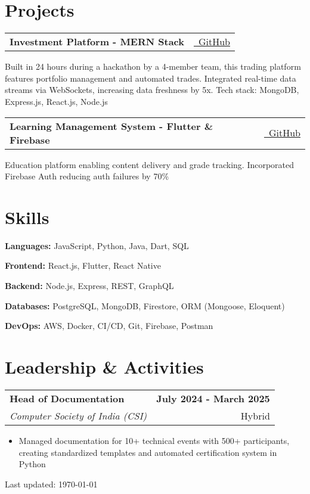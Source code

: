 \documentclass[10pt,a4paper]{article}
\makeatletter
\newcommand{\resumeItem}[1]{\item\small{#1}}
\newcommand{\resumeSubheading}[4]{
  \vspace{0pt}
  \begin{tabular*}{\textwidth}[t]{l@{\extracolsep{\fill}}r}
    \textbf{#1} & \small\textbf{#2} \\
    \textit{\small#3} & \small#4 \\
  \end{tabular*}\vspace{0pt}
}
\newcommand{\resumeProject}[3]{
  \vspace{-2pt}
  \begin{tabular*}{\textwidth}[t]{l@{\extracolsep{\fill}}r}
    \textbf{#1} & #2 \\
  \end{tabular*}
  \noindent
  \small{#3}
  \vspace{0em}
}
\makeatother
\begin{document}
\vspace{0.1em}

\section{Projects}

\resumeProject
{Investment Platform - MERN Stack}
{\href{https://github.com/richiebthomas/FinalSubmissionCodeCrafter}{\faGithub\ GitHub}}
{Built in 24 hours during a hackathon by a 4-member team, this trading platform features portfolio management and automated trades. Integrated real-time data streams via WebSockets, increasing data freshness by 5x. Tech stack: MongoDB, Express.js, React.js, Node.js}

\resumeProject
{Learning Management System - Flutter \& Firebase}
{\href{https://github.com/richiebthomas/flutter_LMS_app}{\faGithub\ GitHub}}
{Education platform enabling content delivery and grade tracking. Incorporated Firebase Auth reducing auth failures by 70\%}

\section*{Skills}

\textbf{Languages:} JavaScript, Python, Java, Dart, SQL

\textbf{Frontend:} React.js, Flutter, React Native

\textbf{Backend:} Node.js, Express, REST, GraphQL

\textbf{Databases:} PostgreSQL, MongoDB, Firestore, ORM (Mongoose, Eloquent)

\textbf{DevOps:} AWS, Docker, CI/CD, Git, Firebase, Postman


\section{Leadership \& Activities}

\resumeSubheading
{Head of Documentation}{July 2024 - March 2025}
{Computer Society of India (CSI)}{Hybrid}
\begin{itemize}
    \resumeItem{Managed documentation for 10+ technical events with 500+ participants, creating standardized templates and automated certification system in Python}
    
\end{itemize}

\vfill
\begin{center}
    \footnotesize Last updated: \today
\end{center}
\end{document}
